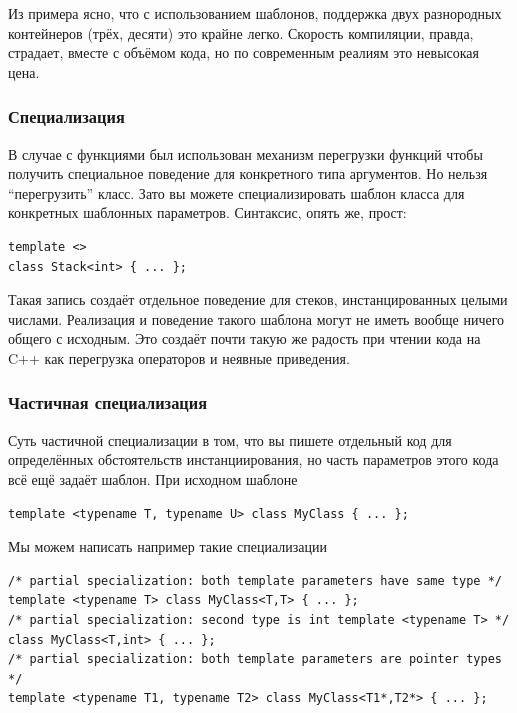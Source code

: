 \documentclass[a4paper,12pt,oneside]{article}
\begin{document}


Из примера ясно, что с использованием шаблонов, поддержка двух разнородных контейнеров (трёх, десяти) это крайне легко. Скорость компиляции, правда, страдает, вместе с объёмом кода, но по современным реалиям это невысокая цена.

\subsubsection{Специализация}

В случае с функциями был использован механизм перегрузки функций чтобы получить специальное поведение для конкретного типа аргументов. Но нельзя ``перегрузить'' класс. Зато вы можете специализировать шаблон класса для конкретных шаблонных параметров. Синтаксис, опять же, прост:

\begin{lstlisting}
template <>
class Stack<int> { ... };
\end{lstlisting}

Такая запись создаёт отдельное поведение для стеков, инстанцированных целыми числами. Реализация и поведение такого шаблона могут не иметь вообще ничего общего с исходным. Это создаёт почти такую же радость при чтении кода на C++ как перегрузка операторов и неявные приведения.

\subsubsection{Частичная специализация}

Суть частичной специализации в том, что вы пишете отдельный код для определённых обстоятельств инстанциирования, но часть параметров этого кода всё ещё задаёт шаблон. При исходном шаблоне

\begin{lstlisting}
template <typename T, typename U> class MyClass { ... };
\end{lstlisting}

Мы можем написать например такие специализации

\begin{lstlisting}
/* partial specialization: both template parameters have same type */ 
template <typename T> class MyClass<T,T> { ... }; 
/* partial specialization: second type is int template <typename T> */ 
class MyClass<T,int> { ... }; 
/* partial specialization: both template parameters are pointer types */
template <typename T1, typename T2> class MyClass<T1*,T2*> { ... };
\end{lstlisting}
\end{document}
